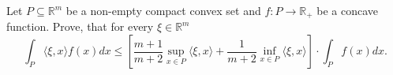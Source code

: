 Let $ P\subseteq \mathbb{R}^m$ be a non-empty compact convex set and $ f: P\rightarrow \mathbb{R}_{ + }$ be a concave function. Prove, that for every $ \xi\in \mathbb{R}^m$
\[ \int_{P}\langle \xi,x \rangle f(x)dx\leq \left[\frac {m + 1}{m + 2}\sup_{x\in P}{\langle\xi,x\rangle} + \frac {1}{m + 2}\inf_{x\in P}{\langle\xi,x\rangle}\right] \cdot\int_{P}f(x)dx.\]